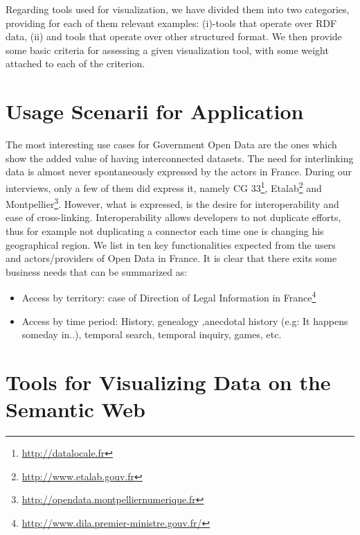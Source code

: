 \documentclass[a4paper,11pt]{report}
\begin{document}
Regarding tools used for visualization, we have divided them into two categories, providing for each of them relevant examples: (i)-tools that operate over RDF data, (ii) and tools that operate over other structured format. We then provide some basic criteria for assessing a given visualization tool, with some weight attached to each of the criterion. 


 \section{Usage Scenarii for Application}
 The most interesting use cases for Government Open Data are the ones which show the added value of having interconnected datasets. The need for interlinking data is almost never spontaneously expressed by the actors in France. During our interviews, only a few of them did express it, namely CG 33\footnote{\url{http://datalocale.fr}}, Etalab\footnote{\url{http://www.etalab.gouv.fr}} and Montpellier\footnote{\url{http://opendata.montpelliernumerique.fr}}. However, what is expressed, is the desire for interoperability and ease of cross-linking. Interoperability allows developers to not duplicate efforts, thus for example not duplicating a connector each time one is changing his geographical region. We list in \cite{deliverable2012a} ten key functionalities expected from the users and actors/providers of Open Data in France. It is clear that there exits some business needs that can be summarized as:
\begin{itemize}
\item Access by territory: case of Direction of Legal Information in France\footnote{\url{http://www.dila.premier-ministre.gouv.fr/}}
\item Access by time period: History, genealogy ,anecdotal history (e.g: It happens someday in..), temporal search, temporal inquiry, games, etc.
\end{itemize}
 


\section{Tools for Visualizing Data on the Semantic Web}
 
\end{document}
